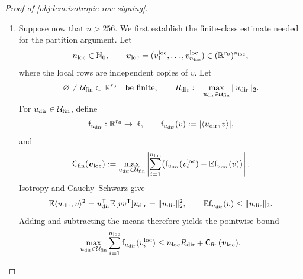 \begin{proof}[Proof of \cref{obj:lem:isotropic-row-signing}]
\begin{enumerate}
Since \(n\leq256\),
\[
\sqrt n\leq16,\qquad
n=(\sqrt n)^2\leq16\sqrt n,
\qquad
n^2\sqrt{r_0}\leq16n\sqrt{nr_0}.
\]
It follows that
\[
\mathbb E\mathsf M_{\rm sign}(\boldsymbol v)
\geq nr_0-16n\sqrt{nr_0}
\geq nr_0-n^2-16n\sqrt{nr_0}.
\]
The same calculation covers \(n=0\).

\item Suppose now that \(n>256\). We first establish the finite-class estimate needed for the partition argument.
Let
\[
n_{\rm loc}\in\mathbb N_0,\qquad
\boldsymbol v_{\rm loc}
=(v^{\rm loc}_1,\ldots,v^{\rm loc}_{n_{\rm loc}})
\in(\mathbb R^{r_0})^{n_{\rm loc}},
\]
where the local rows are independent copies of \(v\). Let
\[
\varnothing\ne\mathcal U_{\rm fin}\subset\mathbb R^{r_0}
\quad\text{be finite},\qquad
R_{\rm dir}:=\max_{u_{\rm dir}\in\mathcal U_{\rm fin}}
\|u_{\rm dir}\|_2.
\]
For \(u_{\rm dir}\in\mathcal U_{\rm fin}\), define
\[
\mathsf f_{u_{\rm dir}}:\mathbb R^{r_0}\to\mathbb R,
\qquad
\mathsf f_{u_{\rm dir}}(v):=|\langle u_{\rm dir},v\rangle|,
\]
and
\[
\mathsf C_{\rm fin}(\boldsymbol v_{\rm loc})
:=
\max_{u_{\rm dir}\in\mathcal U_{\rm fin}}
\left|
\sum_{i=1}^{n_{\rm loc}}
\bigl(\mathsf f_{u_{\rm dir}}(v_i^{\rm loc})
-\mathbb E\mathsf f_{u_{\rm dir}}(v)\bigr)
\right|.
\]
Isotropy and Cauchy--Schwarz give
\[
\mathbb E\langle u_{\rm dir},v\rangle^2
=u_{\rm dir}^{\mathsf T}\mathbb E[vv^{\mathsf T}]u_{\rm dir}
=\|u_{\rm dir}\|_2^2,
\qquad
\mathbb E\mathsf f_{u_{\rm dir}}(v)
\leq\|u_{\rm dir}\|_2.
\]
Adding and subtracting the means therefore yields the pointwise bound
\[
\max_{u_{\rm dir}\in\mathcal U_{\rm fin}}
\sum_{i=1}^{n_{\rm loc}}
\mathsf f_{u_{\rm dir}}(v_i^{\rm loc})
\leq n_{\rm loc}R_{\rm dir}
+\mathsf C_{\rm fin}(\boldsymbol v_{\rm loc}).
\]


\end{enumerate}
\end{proof}
